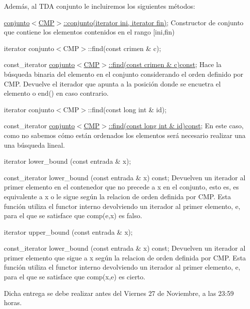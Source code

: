 Además, al T\-D\-A conjunto le incluiremos los siguientes métodos\-: \begin{DoxyItemize}
\item \hyperlink{classconjunto_a15f74d8bf6b88f7b7f5c4cc8e8507b19}{conjunto$<$\-C\-M\-P$>$\-::conjunto(iterator ini, iterator fin)}; Constructor de conjunto que contiene los elementos contenidos en el rango \mbox{[}ini,fin) \item iterator conjunto$<$\-C\-M\-P$>$\-::find(const crimen \& c); \item const\-\_\-iterator \hyperlink{classconjunto_ac69e8200bb0e19785705be34aae32655}{conjunto$<$\-C\-M\-P$>$\-::find(const crimen \& c)const}; Hace la búsqueda binaria del elemento en el conjunto considerando el orden definido por C\-M\-P. Devuelve el iterador que apunta a la posición donde se encuetra el elemento o end() en caso contrario. \item iterator conjunto$<$\-C\-M\-P$>$\-::find(const long int \& id); \item const\-\_\-iterator \hyperlink{classconjunto_a725ddba7aa25ad0576f13000e035ee6f}{conjunto$<$\-C\-M\-P$>$\-::find(const long int \& id)const}; En este caso, como no sabemos cómo están ordenados los elementos será necesario realizar una una búsqueda lineal. \item iterator lower\-\_\-bound (const entrada \& x); \item const\-\_\-iterator lower\-\_\-bound (const entrada \& x) const; Devuelven un iterador al primer elemento en el contenedor que no precede a x en el conjunto, esto es, es equivalente a x o le sigue según la relacion de orden definida por C\-M\-P. Esta función utiliza el functor interno devolviendo un iterador al primer elemento, e, para el que se satisface que comp(e,x) es falso. \item iterator upper\-\_\-bound (const entrada \& x); \item const\-\_\-iterator lower\-\_\-bound (const entrada \& x) const; Devuelven un iterador al primer elemento que sigue a x según la relacion de orden definida por C\-M\-P. Esta función utiliza el functor interno devolviendo un iterador al primer elemento, e, para el que se satisface que comp(x,e) es cierto.\end{DoxyItemize}
Dicha entrega se debe realizar antes del Viernes 27 de Noviembre, a las 23\-:59 horas. 